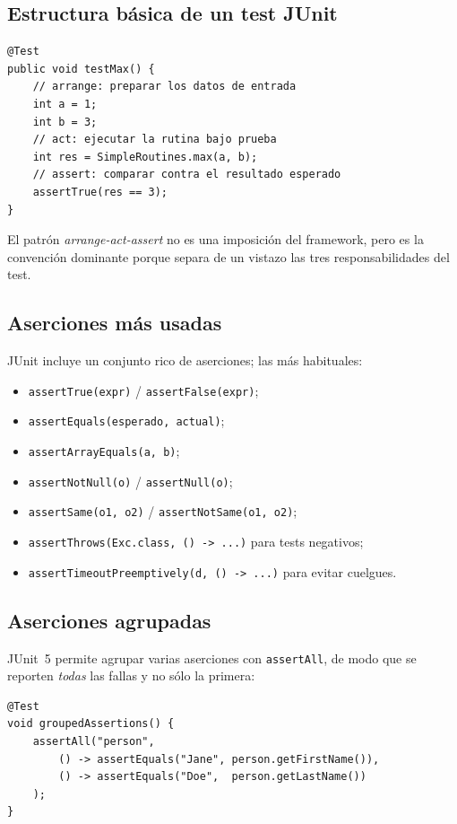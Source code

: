 \documentclass[12pt,a4paper]{article}
\begin{document}
\subsection{Estructura básica de un test JUnit}
\begin{lstlisting}[style=javastyle]
@Test
public void testMax() {
    // arrange: preparar los datos de entrada
    int a = 1;
    int b = 3;
    // act: ejecutar la rutina bajo prueba
    int res = SimpleRoutines.max(a, b);
    // assert: comparar contra el resultado esperado
    assertTrue(res == 3);
}
\end{lstlisting}
El patrón \textit{arrange-act-assert} no es una imposición del framework, pero es la convención dominante porque separa de un vistazo las tres responsabilidades del test.

\subsection{Aserciones más usadas}
JUnit incluye un conjunto rico de aserciones; las más habituales:
\begin{itemize}
  \item \texttt{assertTrue(expr)} / \texttt{assertFalse(expr)};
  \item \texttt{assertEquals(esperado, actual)};
  \item \texttt{assertArrayEquals(a, b)};
  \item \texttt{assertNotNull(o)} / \texttt{assertNull(o)};
  \item \texttt{assertSame(o1, o2)} / \texttt{assertNotSame(o1, o2)};
  \item \texttt{assertThrows(Exc.class, () -> ...)} para tests negativos;
  \item \texttt{assertTimeoutPreemptively(d, () -> ...)} para evitar cuelgues.
\end{itemize}

\subsection{Aserciones agrupadas}
JUnit~5 permite agrupar varias aserciones con \texttt{assertAll}, de modo que se reporten \textit{todas} las fallas y no sólo la primera:
\begin{lstlisting}[style=javastyle]
@Test
void groupedAssertions() {
    assertAll("person",
        () -> assertEquals("Jane", person.getFirstName()),
        () -> assertEquals("Doe",  person.getLastName())
    );
}
\end{lstlisting}
\end{document}
